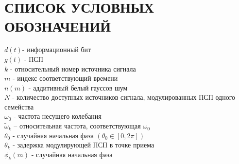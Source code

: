 \section*{СПИСОК УСЛОВНЫХ ОБОЗНАЧЕНИЙ}
\noindent
${d(t)}$- информационный бит \\
${g(t)}$ - ПСП 	\\
${k}$ - относительный номер источника сигнала	\\
${m}$ - индекс соответствующий времени	\\
${n(m)}$ - аддитивный белый гауссов шум \\
${N}$ - количество доступных источников сигнала, модулированных ПСП одного семейства \\

\noindent
${\omega_0}$ - частота несущего колебания \\
${\tilde{\omega}_{k}}$  – относительная частота, соответствующая ${\omega_0}$ \\
${\theta_0}$ - случайная начальная фаза ${(\theta_0 \in [0, 2\pi])}$ \\
${\theta_k}$ - задержка модулирующей ПСП в точке приема \\
${\phi_k(m)}$ - случайная начальная фаза \\

\newpage
